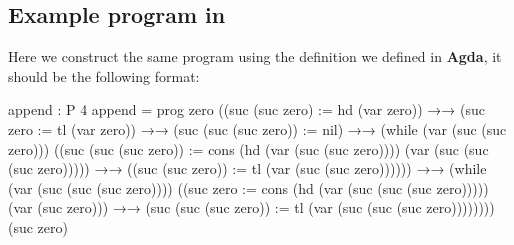 \subsection{Example \WHILE program in \Agda}
Here we construct the same program using the definition we defined in \textbf{Agda}, it should be the following format:
\begin{code}[fontsize=\footnotesize]
append : P 4
append = prog zero
             ((suc (suc zero) := hd (var zero)) 
	     →→
             (suc zero := tl (var zero)) 
	     →→
             (suc (suc (suc zero)) := nil) 
	     →→
             (while
               (var (suc (suc zero)))
               ((suc (suc (suc zero)) := 
			cons (hd (var (suc (suc zero)))) 
			     (var (suc (suc (suc zero))))) 
	       →→
               ((suc (suc zero)) := tl (var (suc (suc zero)))))) 
	       →→
             (while
               (var (suc (suc (suc zero))))
               ((suc zero := cons (hd (var (suc (suc (suc zero))))) 
				  (var (suc zero))) 
	     →→
               (suc (suc (suc zero)) := tl (var (suc (suc (suc zero))))))))
             (suc zero)
\end{code}
